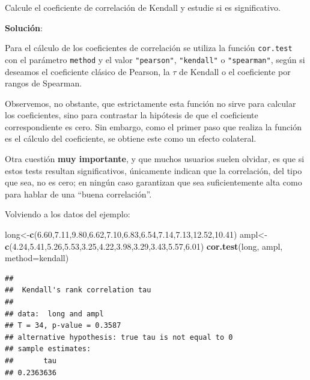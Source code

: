 \documentclass[
]{article}
\newenvironment{Shaded}{\begin{snugshade}}{\end{snugshade}}
\newcommand{\AttributeTok}[1]{\textcolor[rgb]{0.13,0.29,0.53}{#1}}
\newcommand{\FloatTok}[1]{\textcolor[rgb]{0.00,0.00,0.81}{#1}}
\newcommand{\FunctionTok}[1]{\textcolor[rgb]{0.13,0.29,0.53}{\textbf{#1}}}
\newcommand{\NormalTok}[1]{#1}
\newcommand{\OtherTok}[1]{\textcolor[rgb]{0.56,0.35,0.01}{#1}}
\newcommand{\StringTok}[1]{\textcolor[rgb]{0.31,0.60,0.02}{#1}}
\begin{document}
Calcule el coeficiente de correlación de Kendall y estudie si es significativo.

\textbf{Solución}:

Para el cálculo de los coeficientes de correlación se utiliza la función \texttt{cor.test} con el parámetro \texttt{method} y el valor \texttt{"pearson"}, \texttt{"kendall"} o \texttt{"spearman"}, según si deseamos el coeficiente clásico de Pearson, la \(\tau\) de Kendall o el coeficiente por rangos de Spearman.

Observemos, no obstante, que estrictamente esta función no sirve para calcular los coeficientes, sino para contrastar la hipótesis de que el coeficiente correspondiente es cero. Sin embargo, como el primer paso que realiza la función es el cálculo del coeficiente, se obtiene este como un efecto colateral.

Otra cuestión \textbf{muy importante}, y que muchos usuarios suelen olvidar, es que si estos tests resultan significativos, únicamente indican que la correlación, del tipo que sea, no es cero; en ningún caso garantizan que sea suficientemente alta como para hablar de una ``buena correlación''.

Volviendo a los datos del ejemplo:

\begin{Shaded}
\begin{Highlighting}[]
\NormalTok{long}\OtherTok{\textless{}{-}}\FunctionTok{c}\NormalTok{(}\FloatTok{6.60}\NormalTok{,}\FloatTok{7.11}\NormalTok{,}\FloatTok{9.80}\NormalTok{,}\FloatTok{6.62}\NormalTok{,}\FloatTok{7.10}\NormalTok{,}\FloatTok{6.83}\NormalTok{,}\FloatTok{6.54}\NormalTok{,}\FloatTok{7.14}\NormalTok{,}\FloatTok{7.13}\NormalTok{,}\FloatTok{12.52}\NormalTok{,}\FloatTok{10.41}\NormalTok{)}
\NormalTok{ampl}\OtherTok{\textless{}{-}}\FunctionTok{c}\NormalTok{(}\FloatTok{4.24}\NormalTok{,}\FloatTok{5.41}\NormalTok{,}\FloatTok{5.26}\NormalTok{,}\FloatTok{5.53}\NormalTok{,}\FloatTok{3.25}\NormalTok{,}\FloatTok{4.22}\NormalTok{,}\FloatTok{3.98}\NormalTok{,}\FloatTok{3.29}\NormalTok{,}\FloatTok{3.43}\NormalTok{,}\FloatTok{5.57}\NormalTok{,}\FloatTok{6.01}\NormalTok{)}
\FunctionTok{cor.test}\NormalTok{(long, ampl, }\AttributeTok{method=}\StringTok{\textquotesingle{}kendall\textquotesingle{}}\NormalTok{)}
\end{Highlighting}
\end{Shaded}

\begin{verbatim}
## 
##  Kendall's rank correlation tau
## 
## data:  long and ampl
## T = 34, p-value = 0.3587
## alternative hypothesis: true tau is not equal to 0
## sample estimates:
##       tau 
## 0.2363636
\end{verbatim}
\end{document}
